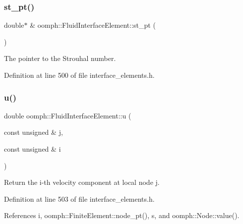 \mbox{\label{classoomph_1_1FluidInterfaceElement_a3fa462bb0ff807cf655ba02b35c1ccb4}} 
\subsubsection{\texorpdfstring{st\+\_\+pt()}{st\_pt()}}
{\footnotesize\ttfamily double$\ast$ \& oomph\+::\+Fluid\+Interface\+Element\+::st\+\_\+pt (\begin{DoxyParamCaption}{ }\end{DoxyParamCaption})\hspace{0.3cm}{\ttfamily [inline]}}



The pointer to the Strouhal number. 



Definition at line 500 of file interface\+\_\+elements.\+h.

\mbox{\label{classoomph_1_1FluidInterfaceElement_a50a509413ea7f2a481678837846dd476}} 
\subsubsection{\texorpdfstring{u()}{u()}}
{\footnotesize\ttfamily double oomph\+::\+Fluid\+Interface\+Element\+::u (\begin{DoxyParamCaption}\item[{const unsigned \&}]{j,  }\item[{const unsigned \&}]{i }\end{DoxyParamCaption})\hspace{0.3cm}{\ttfamily [inline]}}



Return the i-\/th velocity component at local node j. 



Definition at line 503 of file interface\+\_\+elements.\+h.



References i, oomph\+::\+Finite\+Element\+::node\+\_\+pt(), s, and oomph\+::\+Node\+::value().



